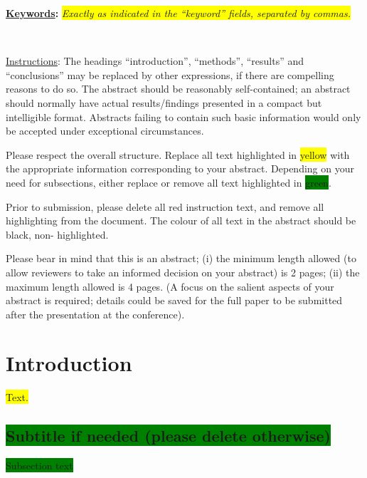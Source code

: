 \documentclass[12pt,a4paper]{article}
\title{
\vspace{-5ex}
\thetitle
\vspace{-2ex}
}
\author{
\theauthors
\vspace{-5ex}
}
\date{}
\def\thekeywords{
\colorbox{yellow}{ %
\textit{Exactly as indicated in the “keyword” fields, separated by commas.}
}%
}
\begin{document}
\cfoot{\thepage} %

\sectionfont{\large\textsc}

\maketitle

{\fontsize{10pt}{12.0pt}\selectfont \textbf{\uline{Keywords}:} \thekeywords\par}\par

{~\\
{\color{red} \noindent \uline{Instructions}:
The headings “introduction”, “methods”, “results” and “conclusions” may be replaced by other expressions, if there are compelling reasons to do so. The abstract should be reasonably self-contained; an abstract should normally have actual results/findings presented in a compact but intelligible format. Abstracts failing to contain such basic information would only be accepted under exceptional circumstances.

Please respect the overall structure. Replace all text highlighted in \colorbox{yellow}{yellow} with the appropriate information corresponding to your abstract. Depending on your need for subsections, either replace or remove all text highlighted in \colorbox{green}{green}.

Prior to submission, please delete all red instruction text, and remove all highlighting from the document. The colour of all text in the abstract should be black, non- highlighted.

Please bear in mind that this is an abstract; (i) the minimum length allowed (to allow reviewers to take an informed decision on your abstract) is 2 pages; (ii) the maximum length allowed is 4 pages. (A focus on the salient aspects of your abstract is required; details could be saved for the full paper to be submitted after the presentation at the conference).
}}

\section{ Introduction}
\colorbox{yellow}{Text.}\par
\subsection{\colorbox{green}{Subtitle if needed (please delete otherwise)}}
\colorbox{green}{Subsection text}
\end{document}
